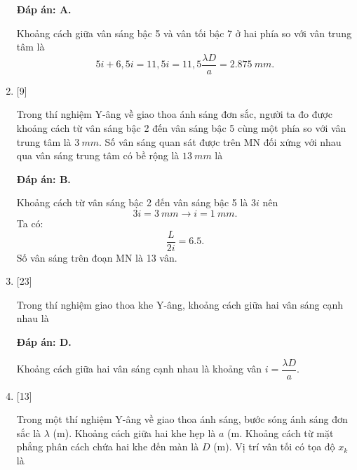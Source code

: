 \begin{enumerate}[label=\bfseries Câu \arabic*:]
	\loigiai
	{		\textbf{Đáp án: A.}
		
		Khoảng cách giữa vân sáng bậc 5 và vân tối bậc 7 ở hai phía so với vân trung tâm là
		$$
		5i + 6,5i = 11,5i = 11,5 \dfrac{\lambda D}{a} = \SI{2,875}{mm}.
		$$
	}
	
	\item {} [9]
	\cauhoi
	{Trong thí nghiệm Y-âng về giao thoa ánh sáng đơn sắc, người ta đo được khoảng cách từ vân sáng bậc 2 đến vân sáng bậc 5 cùng một phía so với vân trung tâm là $\SI{3}{mm}$. Số vân sáng quan sát được trên MN đối xứng với nhau qua vân sáng trung tâm có bề rộng là $\SI{13}{mm}$ là
	}
	
	\loigiai
	{		\textbf{Đáp án: B.}
		
		Khoảng cách từ vân sáng bậc 2 đến vân sáng bậc 5 là $3i$ nên
		$$
		3i = \SI{3}{mm} \rightarrow i = \SI{1}{mm}.
		$$
		Ta có:
		$$
		\dfrac{L}{2i} = \num{6,5}.
		$$
		Số vân sáng trên đoạn MN là 13 vân.
	}
	
	\item {} [23]
	\cauhoi
	{ Trong thí nghiệm giao thoa khe Y-âng, khoảng cách giữa hai vân sáng cạnh nhau là
		
	}
	
	\loigiai
	{		\textbf{Đáp án: D.}
		
		Khoảng cách giữa hai vân sáng cạnh nhau là khoảng vân $i = \dfrac{\lambda D}{a}$.		
	}
	
	\item {} [13]
	\cauhoi
	{Trong một thí nghiệm Y-âng về giao thoa ánh sáng, bước sóng ánh sáng đơn sắc là $\lambda$ (m). Khoảng cách giữa hai khe hẹp là $a$ (m. Khoảng cách từ mặt phẳng phân cách chứa hai khe đến màn là $D$ (m). Vị trí vân tối có tọa độ $x_{k}$ là
	}
	

\end{enumerate}

